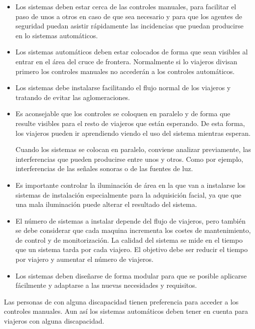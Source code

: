 \begin{itemize}
    \item
    Los sistemas  deben estar cerca de las controles manuales, para facilitar el paso de unos a otros en caso de que sea necesario y para que los agentes de seguridad puedan asistir rápidamente las incidencias que puedan producirse en lo sistemas automáticos.
    \item
    Los sistemas automáticos deben estar colocados de forma que sean visibles al entrar en el área del cruce de frontera. Normalmente si lo viajeros divisan primero los controles manuales no accederán a los controles automáticos.
    \item
    Los sistemas debe instalarse facilitando el flujo normal de los viajeros y tratando de evitar las aglomeraciones.
    \item
    Es aconsejable que los controles se coloquen en paralelo y de forma que resulte visibles para el resto de viajeros que están esperando. De esta forma, los viajeros pueden ir aprendiendo viendo el uso del sistema mientras esperan.
    
    Cuando los sistemas se colocan en paralelo, conviene analizar previamente, las interferencias que pueden producirse entre unos y otros. Como por ejemplo, interferencias de las señales sonoras o de las fuentes de luz.  
    \item
    Es importante controlar la iluminación de área en la que van a instalarse los sistemas de instalación especialmente para la adquisición \gls{facial}, ya que que una mala iluminación puede alterar el resultado del sistema.
    \item
    El número de sistemas a instalar depende del flujo de viajeros, pero también se debe considerar que cada maquina incrementa los costes de mantenimiento, de control y de monitorización. La calidad del sistema se mide en el tiempo que un sistema tarda por cada viajero. El objetivo debe ser reducir el tiempo por viajero y aumentar el número de viajeros.
    \item
    Los sistemas deben diseñarse de forma modular para que se posible aplicarse fácilmente y adaptarse a las nuevas necesidades y requisitos.
\end{itemize}

Las personas de con alguna discapacidad tienen preferencia para acceder a los controles manuales. Aun así los sistemas automáticos deben tener en cuenta para viajeros con alguna discapacidad.


